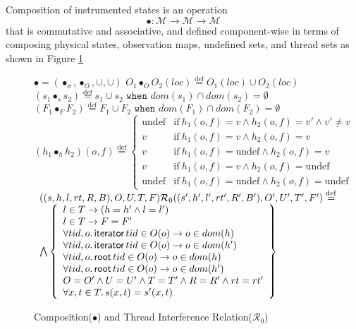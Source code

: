 Composition of instrumented states is an operation
\[\bullet : \mathcal{M} \longrightarrow \mathcal{M} \longrightarrow \mathcal{M}\]
that is commutative and associative, and defined component-wise in terms of composing physical states, observation maps, undefined sets, and thread sets as shown in Figure \ref{fig:compap}
\begin{figure}\scriptsize
$  \bullet  = (\bullet_{\sigma},\bullet_O,\cup,\cup)$ \quad
  $O_{1} \bullet_O O_{2}(loc) \overset{\mathrm{def}}{=}  O_{1}(loc) \cup O_{2}(loc)$\quad
  $ (s_1 \bullet_s s_2) \overset{\mathrm{def}}{=}  s_1 \cup s_2 \texttt{   when   } dom(s_1) \cap dom(s_2) = \emptyset$ \\
  $(F_1 \bullet_F F_2) \overset{\mathrm{def}}{=}  F_1  \cup F_2 \texttt{   when   } dom(F_1) \cap dom(F_2) = \emptyset$ \\
$(h_1\bullet_h h_2)(o,f)\overset{\mathrm{def}}{=}\left\{
\begin{array}{ll}
\mathrm{undef} & \textrm{if}~h_1(o,f)=v \land h_2(o,f)=v' \land v' \neq v\\
v & \textrm{if}~h_1(o,f)=v \land h_2(o,f)=v\\
v & \textrm{if}~h_1(o,f)=\mathrm{undef}\land h_2(o,f)=v\\
v & \textrm{if}~h_1(o,f)=v\land h_2(o,f)=\mathrm{undef}\\
\mathrm{undef} & \textrm{if}~h_1(o,f)=\mathrm{undef}\land h_2(o,f)=\mathrm{undef}
\end{array}
\right.
$
$
\begin{array}{l}
((s,h,l,rt,R,B), O, U, T,F) \mathcal{R}_{0}((s',h',l',rt',R',B'), O', U', T',F') \overset{\mathrm{def}}{=}
\\ \bigwedge\left\{
	\begin{array}{l}
	  l  \in  T \rightarrow (h = h' \land l=l')\\
	  l\in T\rightarrow F=F'\\
	  \forall tid,o\ldotp\textsf{iterator} \, tid \in O(o) \rightarrow o \in dom(h) \\
	  \forall tid,o\ldotp\textsf{iterator} \, tid \in O(o) \rightarrow o \in dom(h') \\
          \forall tid,o\ldotp\textsf{root} \, tid \in O(o) \rightarrow o \in dom(h) \\
	  \forall tid,o\ldotp\textsf{root} \, tid \in O(o) \rightarrow o \in dom(h') \\
	  O = O' \land U = U' \land T = T'\land R =R'\land rt = rt' \\
	  \forall x, t \in T \ldotp s(x,t) = s'(x,t)
	\end{array}
\right\}
\end{array}
$
\caption{Composition($\bullet$) and Thread Interference Relation($\mathcal{R}_{0}$)}
\label{fig:compap}
\vspace{-2mm}
\end{figure}
